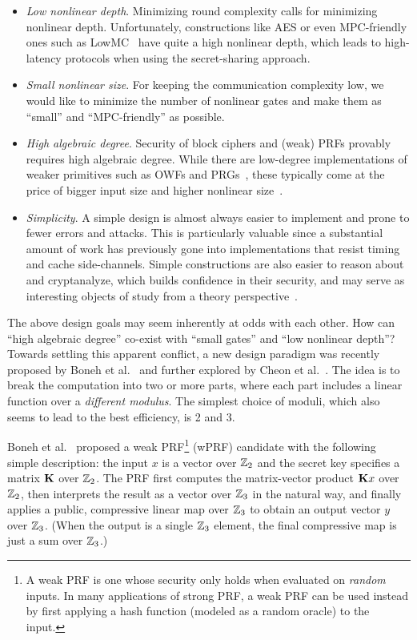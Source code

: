 \begin{itemize}
    \item \textit{Low nonlinear depth}. Minimizing round complexity calls for minimizing nonlinear depth. Unfortunately, constructions like AES or even MPC-friendly ones such as LowMC~\cite{albrecht2015-lowmc} have quite a high nonlinear depth, which leads to high-latency protocols when using the secret-sharing approach.

    \item \textit{Small nonlinear size}. For keeping the communication complexity low, we would like to minimize the number of nonlinear gates and make them as ``small'' and ``MPC-friendly'' as possible.

    \item \textit{High algebraic degree}. Security of block ciphers and (weak) PRFs provably requires high algebraic degree. While there are low-degree implementations of weaker primitives such as OWFs and PRGs~\cite{MQref,Goldreich,ApplebaumIK04}, these typically come at the price of bigger input size and higher nonlinear size~\cite{couteau2018-goldreich-prg,yang2021revisiting}.

    \item \textit{Simplicity}.  A simple design is almost always easier to implement and prone to fewer errors and attacks. This is particularly valuable since a substantial amount of work has previously gone into implementations that resist timing and cache side-channels. Simple constructions are also easier to reason about and cryptanalyze, which builds confidence in their security, and may serve as interesting objects of study from a theory perspective~\cite{Goldreich,MilesV15,AkaviaBGKR14}.
\end{itemize}

 The above design goals may seem inherently at odds with each other. How can ``high algebraic degree'' co-exist with ``small gates'' and ``low nonlinear depth''? Towards settling this apparent conflict, a new design paradigm was recently proposed by Boneh et al.~\cite{boneh2018-darkmatter} and further explored by Cheon et al.~\cite{cheon2020-adventures}. The idea is to break the computation into two or more parts, where each part includes a linear function over a {\em different modulus}. The simplest choice of moduli, which also seems to lead to the best efficiency, is 2 and 3.

Boneh et al.~\cite{boneh2018-darkmatter} proposed a weak PRF\footnote{A weak PRF is one whose security only holds when evaluated on {\em random} inputs. In many applications of strong PRF, a weak PRF can be used instead by first applying a hash function (modeled as a random oracle) to the input.} (wPRF) candidate with the following simple description: the input $x$ is a vector over  $\mathbb{Z}_2$ and the secret key specifies a matrix $\mat{K}$ over  $\mathbb{Z}_2$. The PRF first computes the matrix-vector product $\mat{K}x$ over  $\mathbb{Z}_2$, then interprets the result as a vector over $\mathbb{Z}_3$ in the natural way,  and finally applies a public, compressive linear map over $\mathbb{Z}_3$ to obtain an output vector $y$ over $\mathbb{Z}_3$. (When the output is a single $\mathbb{Z}_3$ element, the final compressive map is just a sum over $\mathbb{Z}_3$.)

